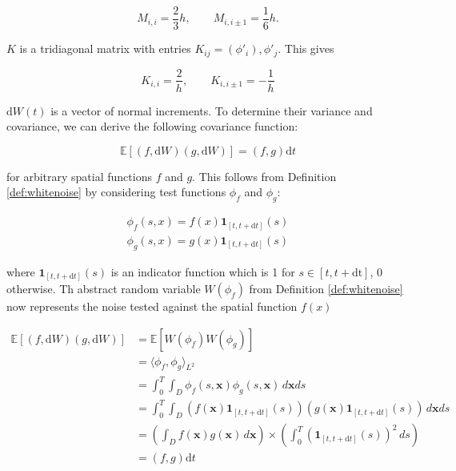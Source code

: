 \begin{equation}
    M_{i,i} = \frac{2}{3}h, \qquad M_{i, i\pm 1} = \frac{1}{6}h.
\end{equation}

$K$ is a tridiagonal matrix with entries $K_{ij} =(\phi'_i), \phi'_j$. This gives

\begin{equation}
    K_{i,i} = \frac{2}{h}, \qquad K_{i, i\pm 1} = - \frac{1}{h}
\end{equation}

$\mathrm{d}W(t)$ is a vector of normal increments. To determine their variance and covariance, 
we can derive the following covariance function:

\begin{equation}
    \mathbb{E}[(f, \mathrm{d}W)(g, \mathrm{d}W)] = (f,g) \mathrm{d}t
\end{equation}

for arbitrary spatial functions $f$ and $g$. This follows from Definition \ref{def:whitenoise}
by considering test functions $\phi_f$ and $\phi_g$:

\begin{align*}
    \phi_f(s,x) = f(x)\mathbf{1}_{[t, t+\mathrm{d}t]}(s)\\
    \phi_g(s,x) = g(x)\mathbf{1}_{[t, t+\mathrm{d}t]}(s)
\end{align*}

where $\mathbf{1}_{[t, t+\mathrm{d}t]}(s)$ is an indicator function which is 1 for
$s \in [t, t + \mathrm{dt}]$, $0$ otherwise. Th abstract random variable 
$W(\phi_f)$ from Definition \ref{def:whitenoise} now represents the noise tested 
against the spatial function $f(x)$


\begin{align*} 
    \mathbb{E}[(f, \mathrm{d}W)(g, \mathrm{d}W)] &= \mathbb{E}[W(\phi_f)W(\phi_g)] \\ 
    &= \langle \phi_f, \phi_g \rangle_{L^2} \\ &= \int_0^T \int_D \phi_f(s, \mathbf{x}) \phi_g(s, \mathbf{x})
     \,d\mathbf{x}ds \\ &= \int_0^T \int_D \left( f(\mathbf{x}) \mathbf{1}_{[t, t+\mathrm{d}t]}(s) \right) 
     \left( g(\mathbf{x}) \mathbf{1}_{[t, t+\mathrm{d}t]}(s) \right) \,d\mathbf{x}ds \\
    &= \left( \int_D f(\mathbf{x})g(\mathbf{x})\,d\mathbf{x} \right)
     \times \left( \int_0^T (\mathbf{1}_{[t, t+\mathrm{d}t]}(s))^2 \,ds \right)  \\
    &= \left(f,g\right) \mathrm{d}t
\end{align*} 


